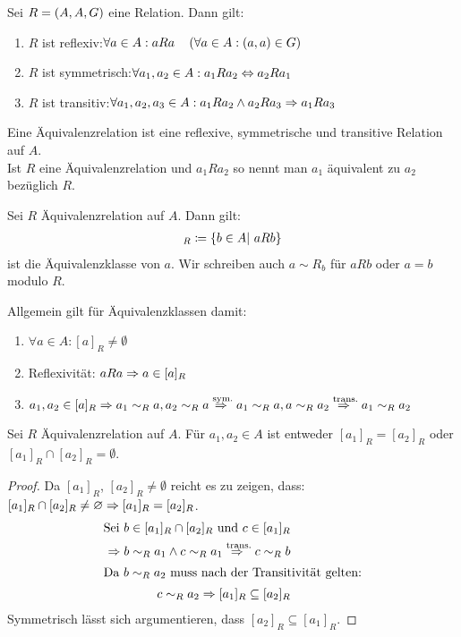 \begin{definition}[Äquivalenzrelation]
    Sei $R=\left(A, A, G\right)$ eine Relation. Dann gilt:
    \begin{enumerate}[label=(\roman*)]
        \item $R$ ist reflexiv:\quad $\forall a\in A: aRa\quad\left(\forall a \in A: (a,a) \in G\right)$
        \item $R$ ist symmetrisch:\quad $\forall a_1, a_2\in A: a_{1}Ra_2\Leftrightarrow{} a_{2}Ra_1$
        \item $R$ ist transitiv:\quad $\forall a_1, a_2, a_3 \in A: a_{1}Ra_{2} \land a_{2}Ra_{3} \Rightarrow{} a_{1}Ra_{3}$
    \end{enumerate}
    Eine Äquivalenzrelation ist eine reflexive, symmetrische und transitive Relation auf $A$.\\
    Ist $R$ eine Äquivalenzrelation und $a_{1}Ra_{2}$ so nennt man $a_{1}$ äquivalent zu $a_{2}$ bezüglich $R$.
\end{definition}

\begin{notation}[Äquivalenzklassen]
    Sei $R$ Äquivalenzrelation auf $A$. Dann gilt:
    \begin{align*}
    [a]
        _{R} \definedas \set{b\in A|~aRb}
    \end{align*} ist die Äquivalenzklasse von $a$. Wir schreiben auch $a\sim R_b$ für $aRb$ oder $a = b$ modulo $R$.
\end{notation}

\begin{beobachtung}
    Allgemein gilt für Äquivalenzklassen damit:
    \theoremescape
    \begin{enumerate}[label=(\roman*)]
        \item $\forall a\in A: [a]_R \neq \emptyset$
        \item Reflexivität: $aRa \Rightarrow{} a\in [a]_R$
        \item $a_1, a_2\in [a]_R \Rightarrow{} a_1 \sim_R a, a_2 \sim_R a \overset{\text{sym.}}{\Rightarrow{}} a_1 \sim_R a, a \sim_R a_2 \overset{\text{trans.}}{\Rightarrow{}} a_1\sim_R a_2$
    \end{enumerate}
\end{beobachtung}

\begin{lemma}
    Sei $R$ Äquivalenzrelation auf $A$. Für $a_1,a_2\in A$ ist entweder $[a_1]_R = [a_2]_R$ oder $[a_1]_R \cap [a_2]_R = \emptyset$.
    \begin{proof}
        Da $[a_1]_R$, $[a_2]_R \neq \emptyset$ reicht es zu zeigen, dass: $[a_1]_R \cap [a_2]_R \neq \varnothing \Rightarrow{} [a_1]_R = [a_2]_R$.
        \begin{align*}
            \text{Sei }b\in [a_1]_R\cap [a_2]_R\text{ und }c\in [a_1]_R\\
            \Rightarrow{} b\sim_R a_1 \land c\sim_R a_1 \overset{\text{trans.}}{\Rightarrow{}} c\sim_R b\\
            \intertext{Da  $b\sim_R a_2$ muss nach der Transitivität gelten:} c\sim_R a_2 \Rightarrow{} [a_1]_R \subseteq [a_2]_R
        \end{align*}
        Symmetrisch lässt sich argumentieren, dass $[a_2]_R \subseteq [a_1]_R$.
    \end{proof}
\end{lemma}


